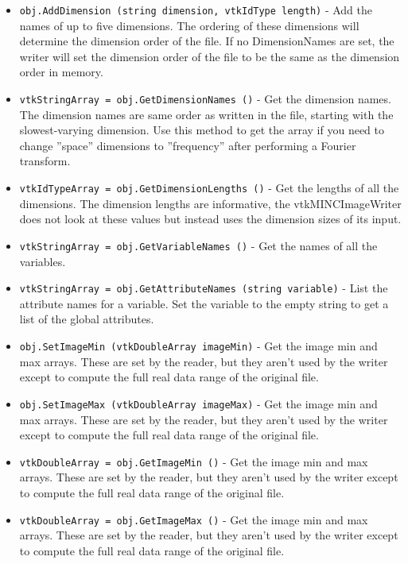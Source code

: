 \begin{itemize}
\item  \verb|obj.AddDimension (string dimension, vtkIdType length)| -  Add the names of up to five dimensions. The ordering of these
 dimensions will determine the dimension order of the file.  If
 no DimensionNames are set, the writer will set the dimension
 order of the file to be the same as the dimension order in memory.

\item  \verb|vtkStringArray = obj.GetDimensionNames ()| -  Get the dimension names.  The dimension names are same order
 as written in the file, starting with the slowest-varying
 dimension.  Use this method to get the array if you need to
 change ''space'' dimensions to ''frequency'' after performing a
 Fourier transform. 

\item  \verb|vtkIdTypeArray = obj.GetDimensionLengths ()| -  Get the lengths of all the dimensions.  The dimension lengths
 are informative, the vtkMINCImageWriter does not look at these values
 but instead uses the dimension sizes of its input.

\item  \verb|vtkStringArray = obj.GetVariableNames ()| -  Get the names of all the variables.

\item  \verb|vtkStringArray = obj.GetAttributeNames (string variable)| -  List the attribute names for a variable.  Set the variable
 to the empty string to get a list of the global attributes.

\item  \verb|obj.SetImageMin (vtkDoubleArray imageMin)| -  Get the image min and max arrays. These are set by the reader,
 but they aren't used by the writer except to compute the full
 real data range of the original file.

\item  \verb|obj.SetImageMax (vtkDoubleArray imageMax)| -  Get the image min and max arrays. These are set by the reader,
 but they aren't used by the writer except to compute the full
 real data range of the original file.

\item  \verb|vtkDoubleArray = obj.GetImageMin ()| -  Get the image min and max arrays. These are set by the reader,
 but they aren't used by the writer except to compute the full
 real data range of the original file.

\item  \verb|vtkDoubleArray = obj.GetImageMax ()| -  Get the image min and max arrays. These are set by the reader,
 but they aren't used by the writer except to compute the full
 real data range of the original file.


\end{itemize}
